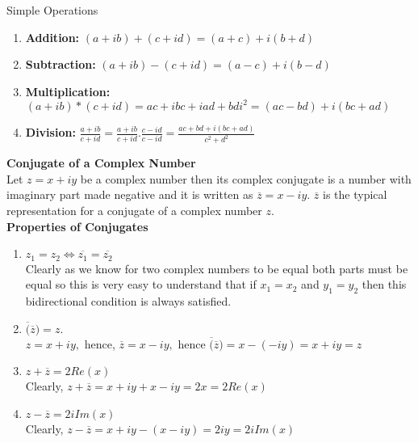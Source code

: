 \documentclass[aspectratio=169,8pt]{beamer}
\newcounter{counter}
\begin{document}
\begin{frame}{Simple Operations}
  \begin{enumerate}
  \item \textbf{Addition:} $(a + ib) + (c + id) = (a + c) + i(b + d)$
  \item \textbf{Subtraction:} $(a + ib) - (c + id) = (a - c) + i(b - d)$
  \item \textbf{Multiplication:} $(a + ib) * (c + id) = ac + ibc + iad + bdi^2 = (ac - bd) + i(bc + ad)$
    \item \textbf{Division:} $\frac{a + ib}{c + id} = \frac{a + ib}{c + id}.\frac{c - id}{c - id} = \frac{ac + bd + i(bc + ad)}{c^2
    + d^2}$
  \end{enumerate}
  \vspace*{.2cm}
  \textbf{\large{Conjugate of a Complex Number}}\\
  \vspace*{.2cm}
  Let $z = x + iy$ be a complex number then its complex conjugate is a number with imaginary part made negative and it is written
  as $\overline{z} = x - iy.$ $\overline{z}$ is the typical representation for a conjugate of a complex number $z$.\\
  \vspace*{0.2cm}
  \textbf{Properties of Conjugates}\\
  \vspace*{0.2cm}
  \begin{enumerate}
  \item $z_1 = z_2 \Leftrightarrow \overline{z_1} = \overline{z_2}$\\
    Clearly as we know for two complex numbers to be equal both parts must be equal so this is very easy to understand that if $x_1
    = x_2$ and $y_1 = y_2$ then this bidirectional condition is always satisfied.
  \item $\overline(\overline{z}) = z.$\\
    $z = x + iy,$ hence, $\overline{z} = x - iy,$ hence $\overline(\overline{z}) = x - (-iy) = x + iy = z$
  \item $z + \overline{z} = 2Re(x)$\\
    Clearly, $z + \overline{z} = x + iy + x - iy = 2x = 2Re(x)$
  \item $z - \overline{z} = 2iIm(x)$\\
    Clearly, $z - \overline{z} = x + iy - (x - iy) = 2iy = 2iIm(x)$
    \setcounter{counter}{\value{enumi}}
  \end{enumerate}
\end{frame}
\end{document}
